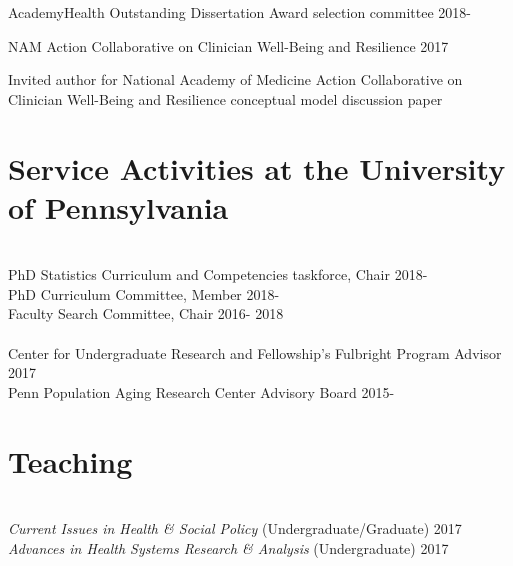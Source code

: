 \documentclass[10pt,]{article}
\begin{document}
{{{{{{{{{{{{{{AcademyHealth Outstanding Dissertation Award selection committee \hfill {2018-{\small{}}}

NAM Action Collaborative on Clinician Well-Being and Resilience \hfill 2017
\vspace{-2.5mm}
\begin{adjustwidth}{0.5cm}{1cm}
Invited author for National Academy of Medicine Action Collaborative on Clinician Well-Being and Resilience conceptual model discussion paper
\end{adjustwidth}

\section{\Large \sc Service Activities at the University of Pennsylvania}
\vspace{-1mm}
\\
PhD Statistics Curriculum and Competencies taskforce, Chair \hfill {2018-{\small{}}}\\
PhD Curriculum Committee, Member \hfill {2018-{\small{}}}\\
Faculty Search Committee, Chair \hfill 2016- 2018\\

\vspace{2mm}
\\ 
Center for Undergraduate Research and Fellowship’s Fulbright Program Advisor \hfill 2017\\	
Penn Population Aging Research Center Advisory Board \hfill {2015-{\small{}}}\\

\section{\Large \sc Teaching}

 \\
{\textit{Current Issues in Health \& Social Policy} {\small{(Undergraduate/Graduate)}} \hfill 2017\\	
{\textit{Advances in Health Systems Research \& Analysis}} {\small{(Undergraduate)}} \hfill 2017\\

}}}}}}}}}}}}}}}
\end{document}
